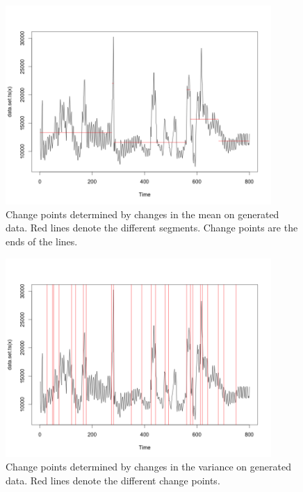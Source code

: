 \documentclass[minf,twoside,singlespacing,parskip,notimes,deptreport]{infthesis} %
\begin{document}
\begin{figure}[]
\begin{center}
\includegraphics[width=0.9\textwidth]{fictional_town_mean}
\end{center}
\caption{Change points determined by changes in the mean on generated data. Red lines denote the different segments. Change points are the ends of the lines.}
\label{mean-best-output}
\end{figure}
\begin{figure}[]
\begin{center}
\includegraphics[width=0.9\textwidth]{changes_in_var}
\end{center}
\caption{Change points determined by changes in the variance on generated data. Red lines denote the different change points.}
\label{var-best-output}
\end{figure}
\end{document}
